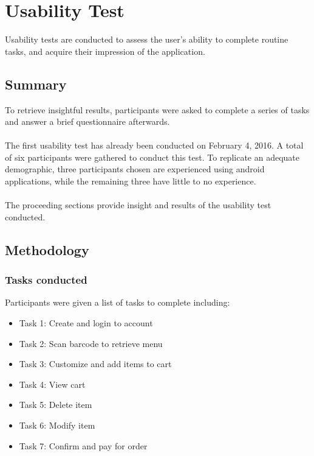 \documentclass[12pt, titlepage]{article}
\begin{document}
\section{Usability Test}
Usability tests are conducted to assess the user's ability to complete routine tasks, and acquire their impression of the application.
\subsection{Summary}

To retrieve insightful results, participants were asked to complete a series of tasks and answer a brief questionnaire afterwards. 
\\\\
The first usability test has already been conducted on February 4, 2016. A total of six participants were gathered to conduct this test. To replicate an adequate demographic, three participants chosen are experienced using android applications, while the remaining three have little to no experience. 
\\\\
The proceeding sections provide insight and results of the usability test conducted. 

\subsection{Methodology}

\subsubsection{Tasks conducted}
Participants were given a list of tasks to complete including: 
\begin{itemize}  
\item Task 1: Create and login to account
\item Task 2: Scan barcode to retrieve menu
\item Task 3: Customize and add items to cart
\item Task 4: View cart
\item Task 5: Delete item
\item Task 6: Modify item
\item Task 7: Confirm and pay for order
\end{itemize}
\end{document}
